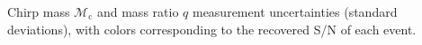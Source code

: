 \label{fig:mass_std_snr} Chirp mass $\mathcal{M}_\mathrm{c}$ and mass ratio $q$ measurement uncertainties (standard deviations), with colors corresponding to the recovered S/N of each event.